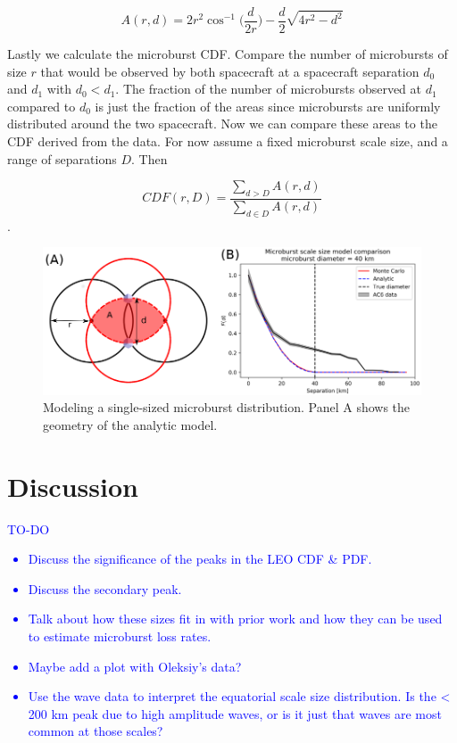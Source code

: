 \documentclass[draft]{agujournal2019}
\begin{document}
\begin{equation}
A(r, d) = 2r^2 \cos^{-1}{\Big( \frac{d}{2r} \Big)} - \frac{d}{2} \sqrt{4r^2 - d^2}
\end{equation}

Lastly we calculate the microburst CDF. Compare the number of microbursts of size $r$ that would be observed by both spacecraft at a spacecraft separation $d_0$ and $d_1$ with $d_0 < d_1$. The fraction of the number of microbursts observed at $d_1$ compared to $d_0$ is just the fraction of the areas since microbursts are uniformly distributed around the two spacecraft. Now we can compare these areas to the CDF derived from the data. For now assume a fixed microburst scale size, and a range of separations $D$. Then 

\begin{equation}
CDF(r, D) = \frac{\sum_{d > D} A(r, d)}{\sum_{d \in D} A(r, d)}
\end{equation}.

\begin{figure}
\includegraphics[width=\textwidth]{fig5.png}
\caption{Modeling a single-sized microburst distribution. Panel A shows the geometry of the analytic model.} 
\label{fig5}
\end{figure}


\section{Discussion}
\textcolor{blue}{
TO-DO
\begin{itemize}
\item Discuss the significance of the peaks in the LEO CDF \& PDF.
\item Discuss the secondary peak.
\item Talk about how these sizes fit in with prior work and how they can be used to estimate microburst loss rates.
\item Maybe add a plot with Oleksiy's data?
\item Use the wave data to interpret the equatorial scale size distribution. Is the < 200 km peak due to high amplitude waves, or is it just that waves are most common at those scales?
\end{itemize}
}
\end{document}
